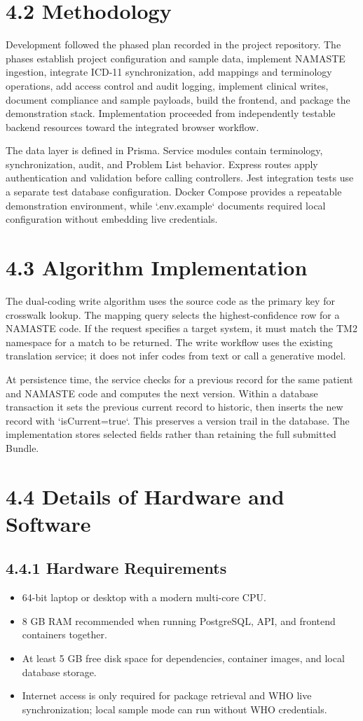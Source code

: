 \documentclass[12pt,a4paper,oneside]{report}
\begin{document}
\section*{4.2 Methodology}
Development followed the phased plan recorded in the project repository. The phases establish project configuration and sample data, implement NAMASTE ingestion, integrate ICD-11 synchronization, add mappings and terminology operations, add access control and audit logging, implement clinical writes, document compliance and sample payloads, build the frontend, and package the demonstration stack. Implementation proceeded from independently testable backend resources toward the integrated browser workflow.

The data layer is defined in Prisma. Service modules contain terminology, synchronization, audit, and Problem List behavior. Express routes apply authentication and validation before calling controllers. Jest integration tests use a separate test database configuration. Docker Compose provides a repeatable demonstration environment, while `.env.example` documents required local configuration without embedding live credentials.

\section*{4.3 Algorithm Implementation}
The dual-coding write algorithm uses the source code as the primary key for crosswalk lookup. The mapping query selects the highest-confidence row for a NAMASTE code. If the request specifies a target system, it must match the TM2 namespace for a match to be returned. The write workflow uses the existing translation service; it does not infer codes from text or call a generative model.

At persistence time, the service checks for a previous record for the same patient and NAMASTE code and computes the next version. Within a database transaction it sets the previous current record to historic, then inserts the new record with `isCurrent=true`. This preserves a version trail in the database. The implementation stores selected fields rather than retaining the full submitted Bundle.

\section*{4.4 Details of Hardware and Software}
\subsection*{4.4.1 Hardware Requirements}
\begin{itemize}
\item 64-bit laptop or desktop with a modern multi-core CPU.
\item 8 GB RAM recommended when running PostgreSQL, API, and frontend containers together.
\item At least 5 GB free disk space for dependencies, container images, and local database storage.
\item Internet access is only required for package retrieval and WHO live synchronization; local sample mode can run without WHO credentials.
\end{itemize}
\end{document}
